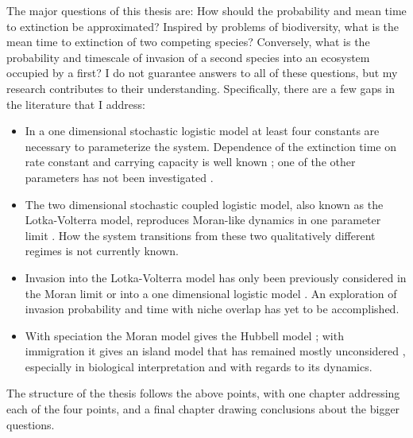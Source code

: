 The major questions of this thesis are: %
How should the probability and mean time to extinction be approximated? 
Inspired by problems of biodiversity, what is the mean time to extinction of two competing species? %
Conversely, what is the probability and timescale of invasion of a second species into an ecosystem occupied by a first? 
I do not guarantee answers to all of these questions, but my research contributes to their understanding. 
%
Specifically, there are a few gaps in the literature that I address: 
\begin{itemize}
	\item In a one dimensional stochastic logistic model at least four constants are necessary to parameterize the system. 
	Dependence of the extinction time on rate constant and carrying capacity is well known \cite{Norden1982,Dushoff2000,Nasell2001,Lambert2005,Assaf2006,Yu2017,Parsons2018}; one of the other parameters has not been investigated \cite{Haegeman2011}. 
	\item The two dimensional stochastic coupled logistic model, also known as the Lotka-Volterra model, reproduces Moran-like dynamics in one parameter limit \cite{Lin2012,Constable2015,Chotibut2015,Young2018}. 
	How the system transitions from these two qualitatively different regimes is not currently known. 
	\item Invasion into the Lotka-Volterra model has only been previously considered in the Moran limit \cite{McKane2004,Lambert2006,Parsons2007,Chalub2016} or into a one dimensional logistic model \cite{Parsons2018}. 
	An exploration of invasion probability and time with niche overlap has yet to be accomplished. 
	\item With speciation the Moran model gives the Hubbell model \cite{Hubbell2001,Leigh2007}; with immigration it gives an island model \cite{MacArthur1967} that has remained mostly unconsidered \cite{McKane2003}, especially in biological interpretation and with regards to its dynamics. 
\end{itemize}
%
The structure of the thesis follows the above points, with one chapter addressing each of the four points, and a final chapter drawing conclusions about the bigger questions. 

